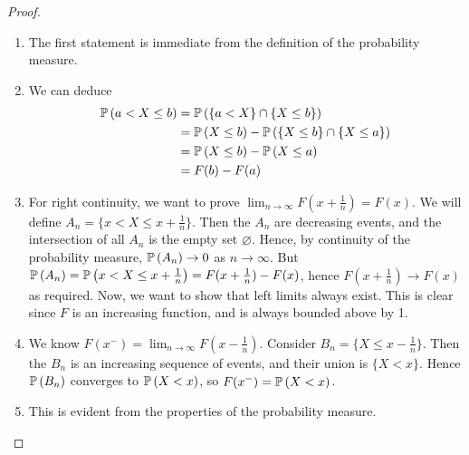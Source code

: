 \begin{proof}
	\begin{enumerate}
		\item The first statement is immediate from the definition of the probability measure.
		\item We can deduce
		      \begin{align*}
			      \mathbb{P}\left({a < X \leq b}\right) & = \mathbb{P}\left({\{ a < X \} \cap \{ X \leq b \}}\right)                  \\
			                          & = \mathbb{P}\left({X \leq b}\right) - \mathbb{P}\left({\{X \leq b\} \cap \{X \leq a\}}\right) \\
			                          & = \mathbb{P}\left({X \leq b}\right) - \mathbb{P}\left({X \leq a}\right)                       \\
			                          & = F(b) - F(a)
		      \end{align*}
		\item For right continuity, we want to prove \(\lim_{n \to \infty} F(x + \frac{1}{n}) = F(x)\).
		      We will define \(A_n = \{ x < X \leq x + \frac{1}{n} \}\).
		      Then the \(A_n\) are decreasing events, and the intersection of all \(A_n\) is the empty set \(\varnothing\).
		      Hence, by continuity of the probability measure, \(\mathbb{P}\left({A_n}\right) \to 0\) as \(n \to \infty\).
		      But \(\mathbb{P}\left({A_n}\right) = \mathbb{P}\left({x < X \leq x + \frac{1}{n}}\right) = F(x + \frac{1}{n}) - F(x)\), hence \(F(x + \frac{1}{n}) \to F(x)\) as required.
		      Now, we want to show that left limits always exist.
		      This is clear since \(F\) is an increasing function, and is always bounded above by 1.
		\item We know \(F(x^-) = \lim_{n \to \infty}F(x - \frac{1}{n})\).
		      Consider \(B_n = \{ X \leq x - \frac{1}{n} \}\).
		      Then the \(B_n\) is an increasing sequence of events, and their union is \(\{ X < x \}\).
		      Hence \(\mathbb{P}\left({B_n}\right)\) converges to \(\mathbb{P}\left({X < x}\right)\), so \(F(x^-) = \mathbb{P}\left({X < x}\right)\).
		\item This is evident from the properties of the probability measure.
	\end{enumerate}
\end{proof}

